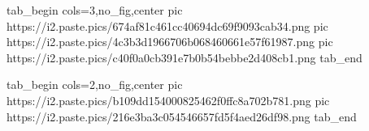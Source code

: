  
 
 
 
 
\zzSecCmtScr


\ifcmt
  tab_begin cols=3,no_fig,center
     pic https://i2.paste.pics/674af81c461cc40694dc69f9093cab34.png
		 pic https://i2.paste.pics/4c3b3d1966706b068460661e57f61987.png
		 pic https://i2.paste.pics/c40f0a0cb391e7b0b54bebbe2d408cb1.png
  tab_end
\fi

\ifcmt
  tab_begin cols=2,no_fig,center
		pic https://i2.paste.pics/b109dd154000825462f0ffc8a702b781.png
		pic https://i2.paste.pics/216e3ba3c054546657fd5f4aed26df98.png
  tab_end
\fi
